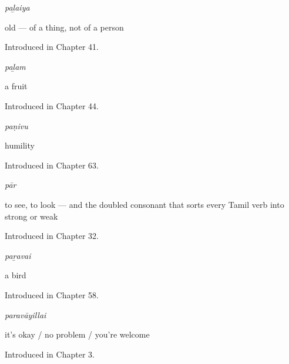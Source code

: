 \noindent\begin{minipage}[t]{\linewidth}
\raggedright
\textbf{}\enspace\emph{paḻaiya}\par
\small old — of a thing, not of a person\par
\footnotesize Introduced in Chapter 41.
\end{minipage}\par\medskip

\noindent\begin{minipage}[t]{\linewidth}
\raggedright
\textbf{}\enspace\emph{paḻam}\par
\small a fruit\par
\footnotesize Introduced in Chapter 44.
\end{minipage}\par\medskip

\noindent\begin{minipage}[t]{\linewidth}
\raggedright
\textbf{}\enspace\emph{paṇivu}\par
\small humility\par
\footnotesize Introduced in Chapter 63.
\end{minipage}\par\medskip

\noindent\begin{minipage}[t]{\linewidth}
\raggedright
\textbf{}\enspace\emph{pār}\par
\small to see, to look — and the doubled consonant that sorts every Tamil verb into strong or weak\par
\footnotesize Introduced in Chapter 32.
\end{minipage}\par\medskip

\noindent\begin{minipage}[t]{\linewidth}
\raggedright
\textbf{}\enspace\emph{paṟavai}\par
\small a bird\par
\footnotesize Introduced in Chapter 58.
\end{minipage}\par\medskip

\noindent\begin{minipage}[t]{\linewidth}
\raggedright
\textbf{}\enspace\emph{paravāyillai}\par
\small it's okay / no problem / you're welcome\par
\footnotesize Introduced in Chapter 3.
\end{minipage}\par\medskip

